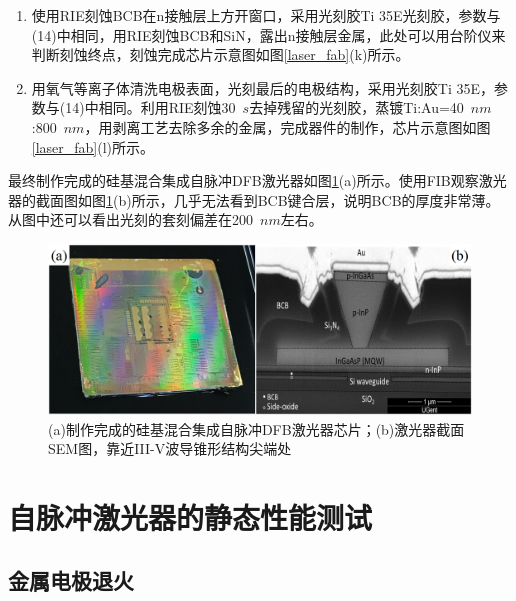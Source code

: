 \begin{enumerate}[(1)]
	光刻制作p金属接触结构(p-contact)的结构，采用Ti Prime和光刻胶Ti 35E，参数与(14)中相同，曝光之后反转。显影之后，蒸镀前利用RIE刻蚀30~$s$去掉残留的光刻胶，用HSO:HO:HO=1:1:20溶液浸泡5~$s$去除氧化层。蒸镀Ti:Au=40~$nm$:150~$nm$，利用剥离工艺去除多余的金属。此时芯片示意图如图\ref{laser_fab}(j)所示，在显微镜下如图\ref{laser_cut}所示。
	\item
	使用RIE刻蚀BCB在n接触层上方开窗口，采用光刻胶Ti 35E光刻胶，参数与(14)中相同，用RIE刻蚀BCB和SiN，露出n接触层金属，此处可以用台阶仪来判断刻蚀终点，刻蚀完成芯片示意图如图\ref{laser_fab}(k)所示。
	\item 
	用氧气等离子体清洗电极表面，光刻最后的电极结构，采用光刻胶Ti 35E，参数与(14)中相同。利用RIE刻蚀30~$s$去掉残留的光刻胶，蒸镀Ti:Au=40~$nm$:800~$nm$，用剥离工艺去除多余的金属，完成器件的制作，芯片示意图如图\ref{laser_fab}(l)所示。
\end{enumerate}



最终制作完成的硅基混合集成自脉冲DFB激光器如图\ref{laser_fabricationresult}(a)所示。使用FIB观察激光器的截面图如图\ref{laser_fabricationresult}(b)所示，几乎无法看到BCB键合层，说明BCB的厚度非常薄。从图中还可以看出光刻的套刻偏差在200~$nm$左右。

\begin{figure}[htb]
	\centering
	\includegraphics[width=15cm]{./Pictures/laser_fabricationresult.jpg}
	\captionsetup{justification=centering}
	\caption{(a)制作完成的硅基混合集成自脉冲DFB激光器芯片；(b)激光器截面SEM图，靠近III-V波导锥形结构尖端处}
	\label{laser_fabricationresult}
\end{figure}


\section{自脉冲激光器的静态性能测试}

\subsection{金属电极退火}

